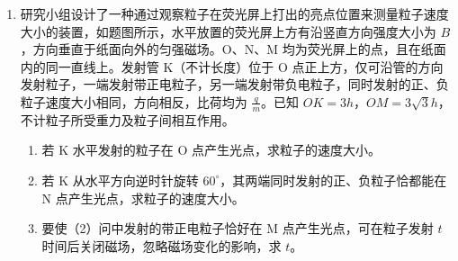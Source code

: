\documentclass[\gkver]{gaokaozhenti}
\begin{document}
\begin{enumerate}
\item
研究小组设计了一种通过观察粒子在荧光屏上打出的亮点位置来测量粒子速度大小的装置，如题图所示，水平放置的荧光屏上方有沿竖直方向强度大小为 $B$，方向垂直于纸面向外的匀强磁场。O、N、M 均为荧光屏上的点，且在纸面内的同一直线上。发射管 K（不计长度）位于 O 点正上方，仅可沿管的方向发射粒子，一端发射带正电粒子，另一端发射带负电粒子，同时发射的正、负粒子速度大小相同，方向相反，比荷均为 $\frac{q}{m}$。已知 $OK = 3h$，$OM = 3\sqrt{3}h$，不计粒子所受重力及粒子间相互作用。
\begin{enumerate}
	\item
	若 K 水平发射的粒子在 O 点产生光点，求粒子的速度大小。
	\item
	若 K 从水平方向逆时针旋转 $60^\circ$，其两端同时发射的正、负粒子恰都能在 N 点产生光点，求粒子的速度大小。
	\item
	要使（2）问中发射的带正电粒子恰好在 M 点产生光点，可在粒子发射 $t$ 时间后关闭磁场，忽略磁场变化的影响，求 $t$。
\end{enumerate}


\end{enumerate}
\end{document}
